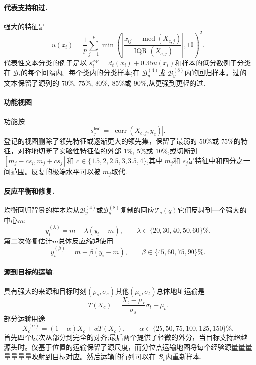 \paragraph{代表支持和过.}强大的特征是
\begin{equation}
  u(x_i)=\frac{1}{p}\sum_{j=1}^{p}
  \min\!\left(\left|\frac{x_{ij}-\operatorname{med}(X_{c,j})}
  {\operatorname{IQR}(X_{c,j})}\right|,10\right)^2.
  \label{eq:robust-feature-outlyingness}
\end{equation}
代表性文本分类的例子是以 $s_i^{\mathrm{rep}}=d_t(x_i)+0.35u(x_i)$和样本的低分数例子分类在 $\mathcal B_t$的每个间隔内。每个类内的分类样本;在 $\mathcal B_y^{(4)}$或 $\mathcal B_y^{(8)}$内的回归样本。过的文本保留了源列的 $70\%$, $75\%$, $80\%$, $85\%$或 $90\%$,从更强到更轻的过.

\paragraph{功能视图}功能按
\begin{equation}
  s_j^{\mathrm{feat}}
  =|\operatorname{corr}(X_{c,j},y_c)|.
  \label{eq:feature-construction-score}
\end{equation}
登记的视图删除了领先特征或逐渐更大的领先集，保留了最弱的 $50\%$或 $75\%$的特征，对称地切断了实验性特征值的外部 $1\%$, $5\%$或 $10\%$,或切断到 $[m_j-cs_j,m_j+cs_j]$和 $c\in\{1.5,2,2.5,3,3.5,4\}$,其中 $m_j$和 $s_j$是特征中和四分之一间范围。反复的极端水平可以被 $m_j$取代.

\paragraph{反应平衡和修复.}均衡回归背景的样本均从$\mathcal B_y^{(4)}$或$\mathcal B_y^{(8)}$复制的回应$\mathcal T_y(q)$它们反射到一个强大的中心$m$:
\begin{equation}
  y_i^{(\lambda)}=m-\lambda(y_i-m),\qquad
  \lambda\in\{20,30,40,50,60\}\%.
  \label{eq:tail-response-repair}
\end{equation}
第二次修复估计$m$总体反应缩短使用
\begin{equation}
  y_i^{(\beta)}=m+\beta(y_i-m),\qquad
  \beta\in\{45,60,75,90\}\%.
  \label{eq:response-contraction}
\end{equation}

\paragraph{源到目标的运输.}具有强大的来源和目标时刻$(\mu_s,\sigma_s)$其他$(\mu_t,\sigma_t)$总体地址运输是
\begin{equation}
  T(X_c)=\frac{X_c-\mu_s}{\sigma_s}\sigma_t+\mu_t.
  \label{eq:full-context-transport}
\end{equation}
部分运输用途
\begin{equation}
  X_c^{(\alpha)}=(1-\alpha)X_c+\alpha T(X_c),\qquad
  \alpha\in\{25,50,75,100,125,150\}\%.
  \label{eq:partial-context-transport}
\end{equation}
首先四个层次从部分到完全的对齐;最后两个提供了轻微的外分，当目标支持超越源头时。仅基于位置的运输保留了源尺度，而分位点运输地图将每个经验源量量量量量量量映射到目标对应。然后运输的行列可以在 $\mathcal B_t$内重新样本.

